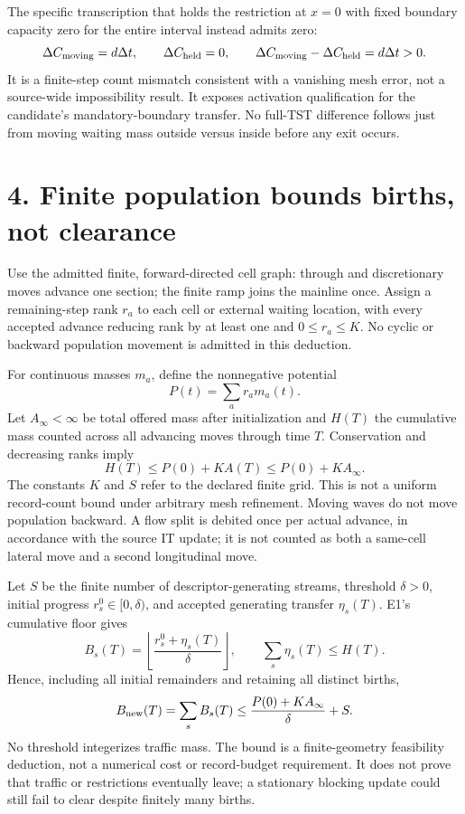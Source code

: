 \documentclass[11pt,a4paper]{article}
\begin{document}
The specific transcription that holds the restriction at $x=0$ with fixed
boundary capacity zero for the entire interval instead admits zero:
\begin{equation}
 \Delta C_{\rm moving}=d\Delta t,\qquad
 \Delta C_{\rm held}=0,\qquad
 \Delta C_{\rm moving}-\Delta C_{\rm held}=d\Delta t>0.
\end{equation}
It is a finite-step count mismatch consistent with a vanishing mesh error,
not a source-wide impossibility result. It exposes activation qualification
for the candidate's mandatory-boundary transfer. No full-TST difference follows
just from moving waiting mass outside versus inside before any exit occurs.

\newpage
\section*{4. Finite population bounds births, not clearance}
Use the admitted finite, forward-directed cell graph: through and discretionary
moves advance one section; the finite ramp joins the mainline once. Assign
a remaining-step rank $r_a$ to each cell or external waiting location, with
every accepted advance reducing rank by at least one and $0\le r_a\le K$.
No cyclic or backward population movement is admitted in this deduction.

For continuous masses $m_a$, define the nonnegative potential
\begin{equation}
 P(t)=\sum_a r_a m_a(t).
\end{equation}
Let $A_\infty<\infty$ be total offered mass after initialization and $H(T)$
the cumulative mass counted across all advancing moves through time $T$.
Conservation and decreasing ranks imply
\begin{equation}
 H(T)\le P(0)+K A(T)\le P(0)+K A_\infty.
\end{equation}
The constants $K$ and $S$ refer to the declared finite grid. This is not a
uniform record-count bound under arbitrary mesh refinement.
Moving waves do not move population backward. A flow split is debited once
per actual advance, in accordance with the source IT update; it is not counted
as both a same-cell lateral move and a second longitudinal move.

Let $S$ be the finite number of descriptor-generating streams, threshold
$\delta>0$, initial progress $r_s^0\in[0,\delta)$, and accepted generating
transfer $\eta_s(T)$. E1's cumulative floor gives
\begin{equation}
 B_s(T)=\left\lfloor\frac{r_s^0+\eta_s(T)}{\delta}\right\rfloor,
 \qquad \sum_s\eta_s(T)\le H(T).
\end{equation}
Hence, including all initial remainders and retaining all distinct births,
\begin{equation}
 B_{\rm new}(T)=\sum_s B_s(T)
 \le\frac{P(0)+K A_\infty}{\delta}+S.
\end{equation}
No threshold integerizes traffic mass. The bound is a finite-geometry
feasibility deduction, not a numerical cost or record-budget requirement.
It does not prove that traffic or restrictions eventually leave; a stationary
blocking update could still fail to clear despite finitely many births.
\end{document}
